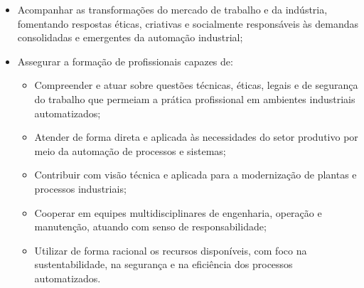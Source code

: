 \begin{itemize}
    \item Acompanhar as transformações do mercado de trabalho e da indústria, fomentando respostas éticas, criativas e socialmente responsáveis às demandas consolidadas e emergentes da automação industrial;
    \item Assegurar a formação de profissionais capazes de:
    \begin{itemize}
        \item Compreender e atuar sobre questões técnicas, éticas, legais e de segurança do trabalho que permeiam a prática profissional em ambientes industriais automatizados;
        \item Atender de forma direta e aplicada às necessidades do setor produtivo por meio da automação de processos e sistemas;
        \item Contribuir com visão técnica e aplicada para a modernização de plantas e processos industriais;
        \item Cooperar em equipes multidisciplinares de engenharia, operação e manutenção, atuando com senso de responsabilidade;
        \item Utilizar de forma racional os recursos disponíveis, com foco na sustentabilidade, na segurança e na eficiência dos processos automatizados.
    \end{itemize}
\end{itemize}
